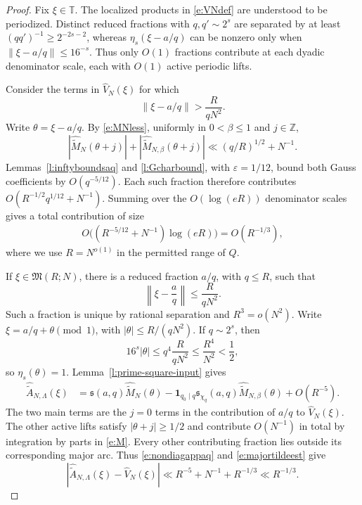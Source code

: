 \documentclass[12pt,reqno]{amsart}
\numberwithin{equation}{section}
\theoremstyle{definition}
\theoremstyle{remark}
\begin{document}
\begin{proof}
Fix \(\xi\in\mathbb T\). The localized products in
\eqref{e:VNdef} are understood to be periodized.
Distinct reduced fractions with \(q,q'\sim2^s\) are separated by
at least \((qq')^{-1}\geq2^{-2s-2}\), whereas
\(\eta_s(\xi-a/q)\) can be nonzero only when
\(\|\xi-a/q\|\leq16^{-s}\).
Thus only \(O(1)\) fractions contribute at each dyadic denominator
scale, each with \(O(1)\) active periodic lifts.

Consider the terms in \(\widehat V_N(\xi)\) for which
\[
 \|\xi-a/q\|>\frac{R}{qN^2}.
\]
Write \(\theta=\xi-a/q\). By \eqref{e:MNless}, uniformly in
\(0<\beta\leq1\) and \(j\in\mathbb Z\),
\[
 |\widehat{\widetilde M}_N(\theta+j)|
 +|\widehat{\widetilde M}_{N,\beta}(\theta+j)|
 \ll(q/R)^{1/2}+N^{-1}.
\]
Lemmas~\ref{l:inftyboundsaq} and \ref{l:Gcharbound}, with
\(\varepsilon=1/12\), bound both Gauss coefficients by
\(O(q^{-5/12})\). Each such fraction therefore contributes
\(O(R^{-1/2}q^{1/12}+N^{-1})\).
Summing over the \(O(\log(eR))\) denominator scales gives a total
contribution of size
\begin{align}\label{e:nondiagappaq}
    O\bigl((R^{-5/12}+N^{-1}) \log(eR)\bigr)=O(R^{-1/3}),
\end{align}
where we use \(R=N^{o(1)}\) in the permitted range of \(Q\).

If \(\xi\in\mathfrak M(R;N)\), there is a reduced fraction
\(a/q\), with \(q\leq R\), such that
\[
 \left\|\xi-\frac aq\right\|\leq\frac{R}{qN^2}.
\]
Such a fraction is unique by rational separation and
\(R^3=o(N^2)\).
Write \(\xi=a/q+\theta\pmod1\), with
\(|\theta|\leq R/(qN^2)\).
If \(q\sim2^s\), then
\[
 16^s|\theta|
 \leq q^4\frac{R}{qN^2}
 \leq\frac{R^4}{N^2}<\frac12,
\]
so \(\eta_s(\theta)=1\).
Lemma~\ref{l:prime-square-input} gives
\begin{align}\label{e:majortildeest}
 \widehat{\widetilde A}_{N,\Lambda}(\xi)
 &=
 \mathfrak s(a,q)\widehat{\widetilde M}_N(\theta)
 -\mathbf1_{q_0\mid q}\mathfrak s_{\chi_q}(a,q)
   \widehat{\widetilde M}_{N,\beta}(\theta)
 +O(R^{-5}).
\end{align}
The two main terms are the \(j=0\) terms in the contribution of
\(a/q\) to \(\widehat V_N(\xi)\).
The other active lifts satisfy \(|\theta+j|\geq1/2\) and contribute
\(O(N^{-1})\) in total by integration by parts in \eqref{e:M}.
Every other contributing fraction lies outside its corresponding
major arc. Thus \eqref{e:nondiagappaq} and
\eqref{e:majortildeest} give
\[
 |\widehat{\widetilde A}_{N,\Lambda}(\xi)-\widehat V_N(\xi)|
 \ll R^{-5}+N^{-1}+R^{-1/3}
 \ll R^{-1/3}.
\]


\end{proof}
\end{document}

